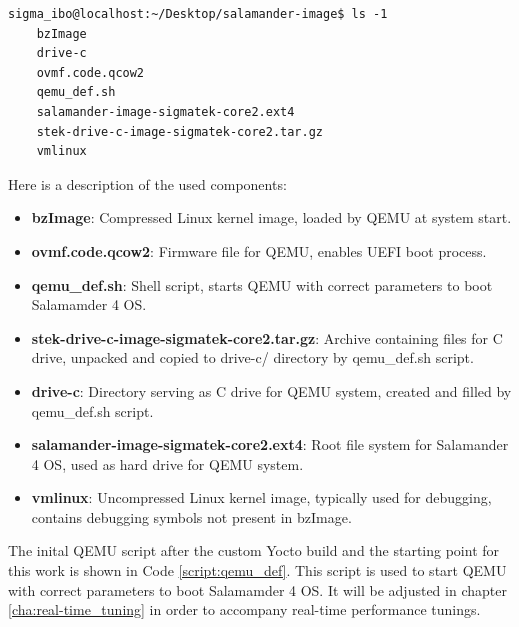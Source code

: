 \documentclass[MMR,Master,english]{twbook}
\begin{document}
\vspace{1em}
\begin{minipage}{\linewidth}
	\begin{lstlisting}[name={Contents of QEMU folder for Salamander 4},label={lst:ls}]
    sigma_ibo@localhost:~/Desktop/salamander-image$ ls -1
    bzImage
    drive-c
    ovmf.code.qcow2
    qemu_def.sh
    salamander-image-sigmatek-core2.ext4
    stek-drive-c-image-sigmatek-core2.tar.gz
    vmlinux
    \end{lstlisting}
\end{minipage}


Here is a description of the used components:
\begin{itemize}
	\item \textbf{bzImage}: Compressed Linux kernel image, loaded by QEMU at system start.
	\item \textbf{ovmf.code.qcow2}: Firmware file for QEMU, enables UEFI boot process.
	\item \textbf{qemu\_def.sh}: Shell script, starts QEMU with correct parameters to boot Salamamder 4 OS.
	\item \textbf{stek-drive-c-image-sigmatek-core2.tar.gz}: Archive containing files for C drive, unpacked and copied to drive-c/ directory by qemu\_def.sh script.
	\item \textbf{drive-c}: Directory serving as C drive for QEMU system, created and filled by qemu\_def.sh script.
	\item \textbf{salamander-image-sigmatek-core2.ext4}: Root file system for Salamander 4 OS, used as hard drive for QEMU system.
	\item \textbf{vmlinux}: Uncompressed Linux kernel image, typically used for debugging, contains debugging symbols not present in bzImage.
\end{itemize}

\noindent The inital QEMU script after the custom Yocto build and the starting point for this work is shown in Code \ref{script:qemu_def}. This script is used to start QEMU with correct parameters to boot Salamamder 4 OS. It will be adjusted in chapter \ref{cha:real-time_tuning} in order to accompany real-time performance tunings. 
\end{document}

